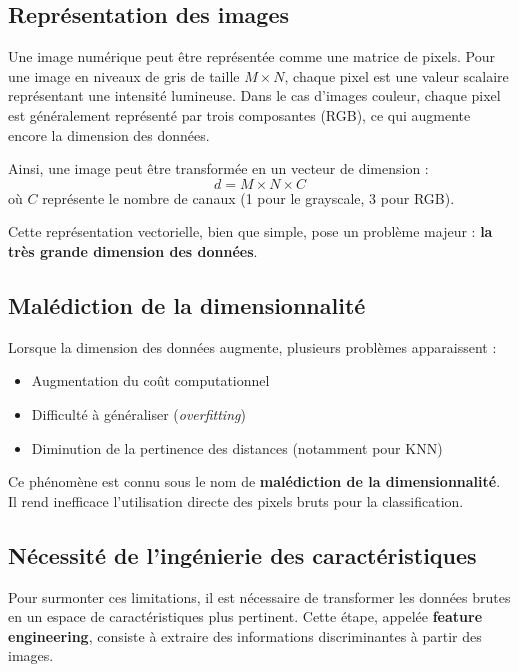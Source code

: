 \documentclass[12pt,a4paper]{article}
\begin{document}
    \subsection{Représentation des images}

    Une image numérique peut être représentée comme une matrice de pixels.
    Pour une image en niveaux de gris de taille \(M \times N\), chaque pixel est une valeur scalaire représentant une intensité lumineuse.
    Dans le cas d’images couleur, chaque pixel est généralement représenté par trois composantes (RGB), ce qui augmente encore la dimension des données.

    Ainsi, une image peut être transformée en un vecteur de dimension :
    \[
    d = M \times N \times C
    \]
    où \(C\) représente le nombre de canaux (1 pour le grayscale, 3 pour RGB).

    Cette représentation vectorielle, bien que simple, pose un problème majeur : \textbf{la très grande dimension des données}.

    \subsection{Malédiction de la dimensionnalité}

    Lorsque la dimension des données augmente, plusieurs problèmes apparaissent :
    \begin{itemize}
        \item Augmentation du coût computationnel
        \item Difficulté à généraliser (\textit{overfitting})
        \item Diminution de la pertinence des distances (notamment pour KNN)
    \end{itemize}

    Ce phénomène est connu sous le nom de \textbf{malédiction de la dimensionnalité}.
    Il rend inefficace l’utilisation directe des pixels bruts pour la classification.

    \subsection{Nécessité de l’ingénierie des caractéristiques}

    Pour surmonter ces limitations, il est nécessaire de transformer les données brutes en un espace de caractéristiques plus pertinent.
    Cette étape, appelée \textbf{feature engineering}, consiste à extraire des informations discriminantes à partir des images.
\end{document}
